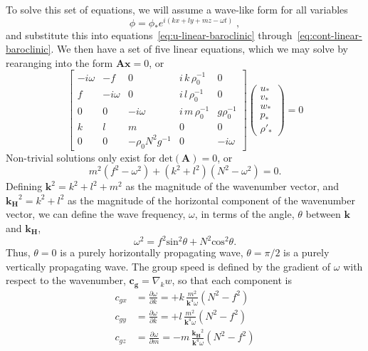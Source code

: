\documentclass[11pt]{report}
\numberwithin{equation}{section}
\begin{document}
To solve this set of equations, we will assume a wave-like form for all variables
\begin{equation}
    \phi = \phi_* e^{i(kx+ly+mz-\omega{}t)} \; ,
\end{equation}
and substitute this into equations~\ref{eq:u-linear-baroclinic} through~\ref{eq:cont-linear-baroclinic}.  We then have a set of five linear equations, which we may solve by rearanging into the form $\mathrm{\mathbf{A}} \mathbf{x} = 0$, or
\begin{equation}
    \left[
    \begin{array}{ccccc}
         -i \omega & -f & 0 & i \,k\, \rho_0^{-1} & 0 \\
         f & -i \omega & 0 & i \,l\, \rho_0^{-1} &  0 \\
         0 & 0 & -i \omega & i \,m\, \rho_0^{-1} & g \rho_0^{-1} \\
         k & l & m & 0 & 0 \\
         0 & 0 & -\rho_0 N^2 g^{-1} & 0 & -i \omega
    \end{array}
    \right]
    \left(
    \begin{array}{c}
        u_* \\ v_* \\ w_* \\ p_* \\ \rho'_*
    \end{array}
    \right) = 0
\end{equation}
Non-trivial solutions only exist for $\mathrm{det}(\mathrm{\mathbf{A}})=0$, or
\begin{equation}
    m^2 (f^2 - \omega^2) + (k^2 + l^2)(N^2-\omega^2) = 0.
\end{equation}
Defining $\mathbf{k}^2 = k^2 + l^2 + m^2$ as the magnitude of the wavenumber vector, and $\mathbf{k_H}^2 = k^2 + l^2$ as the magnitude of the horizontal component of the wavenumber vector, we can define the wave frequency, $\omega$, in terms of the angle, $\theta$ between $\mathbf{k}$ and $\mathbf{k_H}$,
\begin{equation}
    \omega^2 = f^2 \mathrm{sin}^2\theta + N^2 \mathrm{cos}^2\theta .
\end{equation}
Thus, $\theta = 0$ is a purely horizontally propagating wave, $\theta = \pi / 2$ is a purely vertically propagating wave.  The group speed is defined by the gradient of $\omega$ with respect to the wavenumber, $\mathbf{c_g} = \nabla_k w$, so that each component is
\begin{align}
    c_{gx} &= \frac{\partial \omega}{\partial k}
           = +k \,\frac{m^2}{\mathbf{k}^4 \omega}(N^2-f^2)\\
    c_{gy} &= \frac{\partial \omega}{\partial k}
           = +l \,\frac{m^2}{\mathbf{k}^4 \omega}(N^2-f^2)\\
    c_{gz} &= \frac{\partial \omega}{\partial m}
           = -m \,\frac{\mathbf{k_H}^2 }{\mathbf{k}^4 \omega}(N^2 - f^2)
\end{align}
\end{document}
